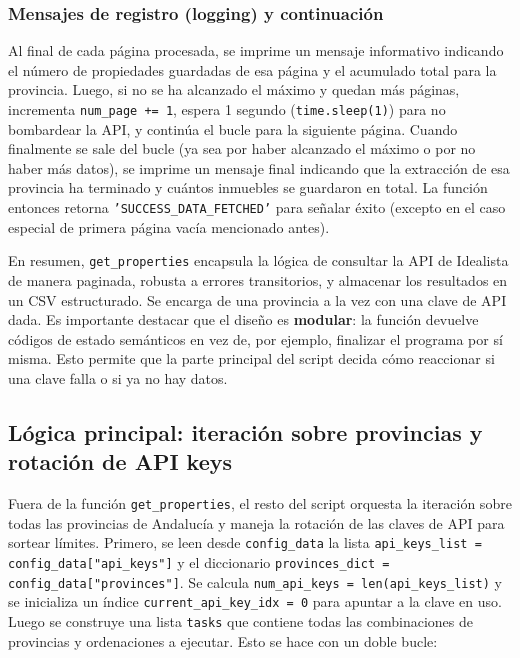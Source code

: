 \documentclass[a4paper,11pt]{book}
\begin{document}
\subsubsection*{Mensajes de registro (logging) y continuación}
Al final de cada página procesada, se imprime un mensaje informativo indicando el número de propiedades guardadas de esa página y el acumulado total para la provincia. Luego, si no se ha alcanzado el máximo y quedan más páginas, incrementa \texttt{num\_page += 1}, espera 1 segundo (\texttt{time.sleep(1)}) para no bombardear la API, y continúa el bucle para la siguiente página. Cuando finalmente se sale del bucle (ya sea por haber alcanzado el máximo o por no haber más datos), se imprime un mensaje final indicando que la extracción de esa provincia ha terminado y cuántos inmuebles se guardaron en total. La función entonces retorna \texttt{'SUCCESS\_DATA\_FETCHED'} para señalar éxito (excepto en el caso especial de primera página vacía mencionado antes).

En resumen, \texttt{get\_properties} encapsula la lógica de consultar la API de Idealista de manera paginada, robusta a errores transitorios, y almacenar los resultados en un CSV estructurado. Se encarga de una provincia a la vez con una clave de API dada. Es importante destacar que el diseño es \textbf{modular}: la función devuelve códigos de estado semánticos en vez de, por ejemplo, finalizar el programa por sí misma. Esto permite que la parte principal del script decida cómo reaccionar si una clave falla o si ya no hay datos.

\subsection*{Lógica principal: iteración sobre provincias y rotación de API keys}
Fuera de la función \texttt{get\_properties}, el resto del script orquesta la iteración sobre todas las provincias de Andalucía y maneja la rotación de las claves de API para sortear límites. Primero, se leen desde \texttt{config\_data} la lista \texttt{api\_keys\_list = config\_data["api\_keys"]} y el diccionario \texttt{provinces\_dict = config\_data["provinces"]}. Se calcula \texttt{num\_api\_keys = len(api\_keys\_list)} y se inicializa un índice \texttt{current\_api\_key\_idx = 0} para apuntar a la clave en uso. Luego se construye una lista \texttt{tasks} que contiene todas las combinaciones de provincias y ordenaciones a ejecutar. Esto se hace con un doble bucle:
\end{document}

